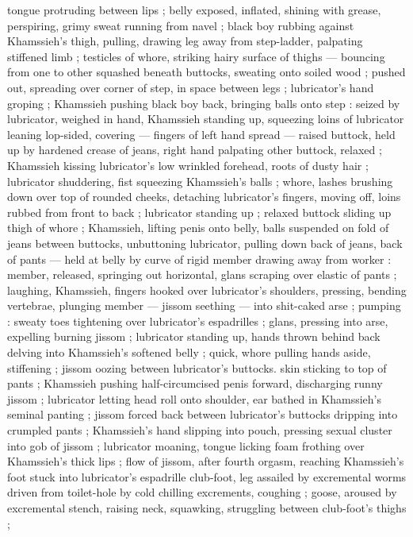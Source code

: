 tongue protruding between lips ; belly exposed, inflated, shining with grease, perspiring, grimy
sweat running from navel ; black boy rubbing against Khamssieh's thigh, pulling, drawing leg away
from step-ladder, palpating stiffened limb ; testicles of whore, striking hairy surface of thighs
--- bouncing from one to other {\dashcom} squashed beneath buttocks, sweating onto soiled wood ;
pushed out, spreading over corner of step, in space between legs ; lubricator's hand groping ;
Khamssieh pushing black boy back, bringing balls onto step : seized by lubricator, weighed in hand,
Khamssieh standing up, squeezing loins of lubricator leaning lop-sided, covering --- fingers of left
hand spread --- raised buttock, held up by hardened crease of jeans, right hand palpating other
buttock, relaxed ; Khamssieh kissing lubricator's low wrinkled forehead, roots of dusty hair ;
lubricator shuddering, fist squeezing Khamssieh's balls ; whore, lashes brushing down over top of
rounded cheeks, detaching lubricator's fingers, moving off, loins rubbed from front to back ;
lubricator standing up ; relaxed buttock sliding up thigh of whore ; Khamssieh, lifting penis onto
belly, balls suspended on fold of jeans between buttocks, unbuttoning lubricator, pulling down back
of jeans, back of pants --- held at belly by curve of rigid member {\dashcom} drawing away from
worker : member, released, springing out horizontal, glans scraping over elastic of pants ;
laughing, Khamssieh, fingers hooked over lubricator's %
shoulders, pressing, bending vertebrae, plunging member --- jissom seething --- into shit-caked arse
; pumping : sweaty toes tightening over lubricator's espadrilles ; glans, pressing into arse,
expelling burning jissom ; lubricator standing up, hands thrown behind back delving into Khamssieh's
softened belly ; quick, whore pulling hands aside, stiffening ; jissom oozing between lubricator's
buttocks. skin sticking to top of pants ; Khamssieh pushing half-circumcised penis forward,
discharging runny jissom ; lubricator letting head roll onto shoulder, ear bathed in Khamssieh's
seminal panting ; jissom forced back between lubricator's buttocks dripping into crumpled pants ;
Khamssieh's hand slipping into pouch, pressing sexual cluster into gob of jissom ; lubricator
moaning, tongue licking foam frothing over Khamssieh's thick lips ; flow of jissom, after fourth
orgasm, reaching Khamssieh's foot stuck into lubricator's espadrille {\semislash} club-foot, leg
assailed by excremental worms driven from toilet-hole by cold chilling excrements, coughing ; goose,
aroused by excremental stench, raising neck, squawking, struggling between club-foot's thighs ;

